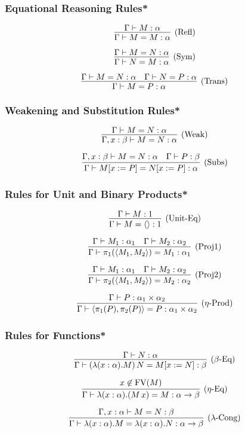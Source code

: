 \documentclass[aspectratio=169]{beamer}
\begin{document}
\begin{frame}
\frametitle{Equational Reasoning Rules*}

\[
\infer[\text{(Refl)}]{\Gamma \vdash M = M : \alpha}{\Gamma \vdash M : \alpha}
\]

\[
\infer[\text{(Sym)}]{\Gamma \vdash N = M : \alpha}{\Gamma \vdash M = N : \alpha}
\]

\[
\infer[\text{(Trans)}]{\Gamma \vdash M = P : \alpha}{\Gamma \vdash M = N : \alpha & \Gamma \vdash N = P : \alpha}
\]
\end{frame}

\begin{frame}
\frametitle{Weakening and Substitution Rules*}

\[
\infer[\text{(Weak)}]{\Gamma, x : \beta \vdash M = N : \alpha}{\Gamma \vdash M = N : \alpha}
\]

\[
\infer[\text{(Subs)}]{\Gamma \vdash M[x := P] = N[x := P] : \alpha}{\Gamma, x : \beta \vdash M = N : \alpha & \Gamma \vdash P : \beta}
\]
\end{frame}

\begin{frame}
\frametitle{Rules for Unit and Binary Products*}

\[
\infer[\text{(Unit-Eq)}]{\Gamma \vdash M = \langle\rangle : 1}{\Gamma \vdash M : 1}
\]

\[
\infer[\text{(Proj1)}]{\Gamma \vdash \pi_1(\langle M_1, M_2 \rangle) = M_1 : \alpha_1}{\Gamma \vdash M_1 : \alpha_1 & \Gamma \vdash M_2 : \alpha_2}
\]

\[
\infer[\text{(Proj2)}]{\Gamma \vdash \pi_2(\langle M_1, M_2 \rangle) = M_2 : \alpha_2}{\Gamma \vdash M_1 : \alpha_1 & \Gamma \vdash M_2 : \alpha_2}
\]

\[
\infer[\text{($\eta$-Prod)}]{\Gamma \vdash \langle \pi_1(P), \pi_2(P) \rangle = P : \alpha_1 \times \alpha_2}{\Gamma \vdash P : \alpha_1 \times \alpha_2}
\]
\end{frame}

\begin{frame}
\frametitle{Rules for Functions*}

\[
\infer[\text{($\beta$-Eq)}]{\Gamma \vdash (\lambda (x : \alpha). M) \, N = M[x := N] : \beta}{\Gamma \vdash N : \alpha}
\]

\[
\infer[\text{($\eta$-Eq)}]{\Gamma \vdash \lambda (x : \alpha). (M \, x) = M : \alpha \rightarrow \beta}{x \not\in \text{FV}(M)}
\]

\[
\infer[\text{($\lambda$-Cong)}]{\Gamma \vdash \lambda (x : \alpha). M = \lambda (x : \alpha). N : \alpha \rightarrow \beta}{\Gamma, x : \alpha \vdash M = N : \beta}
\]

\end{frame}
\end{document}
